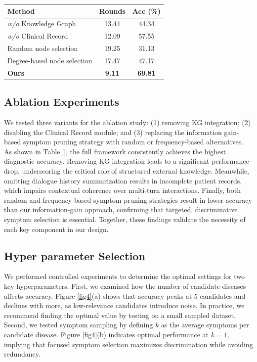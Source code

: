 \documentclass[11pt]{article}
\begin{document}
\begin{table}[t]
	\centering
	\small
	\label{table2}
	\setlength{\tabcolsep}{3pt}
	\renewcommand{\arraystretch}{1.4}
	\begin{tabular*}{\linewidth}{@{\extracolsep{\fill}}lcc@{}}
		\toprule
		\textbf{Method} & \textbf{Rounds} & \textbf{Acc (\%)} \\ \midrule
		{\textit{w/o}} Knowledge Graph & 13.44 & 44.34 \\
		\textit{w/o} Clinical Record & 12.09 & 57.55 \\
		Random node selection & 19.25 & 31.13 \\
		Degree-based node selection & 17.47 & 47.17 \\ \midrule
		\textbf{Ours} & \textbf{9.11} & \textbf{69.81}\\ 
		\bottomrule
	\end{tabular*}
\end{table}

\subsection{Ablation Experiments}
We tested three variants for the ablation study: (1) removing KG integration; (2) disabling the Clinical Record module; and (3) replacing the information gain-based symptom pruning strategy with random or frequency-based alternatives.
As shown in Table \ref{table2}, the full framework consistently achieves the highest diagnostic accuracy. Removing KG integration leads to a significant performance drop, underscoring the critical role of structured external knowledge. Meanwhile, omitting dialogue history summarization results in incomplete patient records, which impairs contextual coherence over multi-turn interactions. Finally, both random and frequency-based symptom pruning strategies result in lower accuracy than our information-gain approach, confirming that targeted, discriminative symptom selection is essential.
Together, these findings validate the necessity of each key component in our design.

\subsection{Hyper parameter Selection}
We performed controlled experiments to determine the optimal settings for two key hyperparameters.
First, we examined how the number of candidate diseases affects accuracy. Figure \ref{fig4}(a) shows that accuracy peaks at 5 candidates and declines with more, as low-relevance candidates introduce noise. In practice, we recommend finding the optimal value by testing on a small sampled dataset.
Second, we tested symptom sampling by defining $k$ as the average symptoms per candidate disease. Figure \ref{fig4}(b) indicates optimal performance at $k=1$, implying that focused symptom selection maximizes discrimination while avoiding redundancy.
\end{document}
